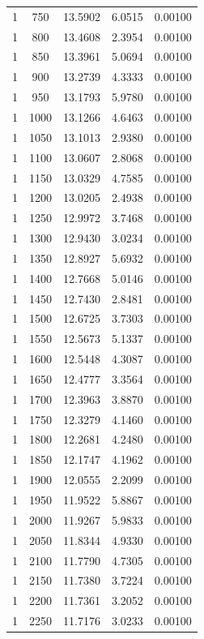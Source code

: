 \begin{longtable}{ccccc}
    1 & 750 & 13.5902 & 6.0515 & 0.00100 \\
    1 & 800 & 13.4608 & 2.3954 & 0.00100 \\
    1 & 850 & 13.3961 & 5.0694 & 0.00100 \\
    1 & 900 & 13.2739 & 4.3333 & 0.00100 \\
    1 & 950 & 13.1793 & 5.9780 & 0.00100 \\
    1 & 1000 & 13.1266 & 4.6463 & 0.00100 \\
    1 & 1050 & 13.1013 & 2.9380 & 0.00100 \\
    1 & 1100 & 13.0607 & 2.8068 & 0.00100 \\
    1 & 1150 & 13.0329 & 4.7585 & 0.00100 \\
    1 & 1200 & 13.0205 & 2.4938 & 0.00100 \\
    1 & 1250 & 12.9972 & 3.7468 & 0.00100 \\
    1 & 1300 & 12.9430 & 3.0234 & 0.00100 \\
    1 & 1350 & 12.8927 & 5.6932 & 0.00100 \\
    1 & 1400 & 12.7668 & 5.0146 & 0.00100 \\
    1 & 1450 & 12.7430 & 2.8481 & 0.00100 \\
    1 & 1500 & 12.6725 & 3.7303 & 0.00100 \\
    1 & 1550 & 12.5673 & 5.1337 & 0.00100 \\
    1 & 1600 & 12.5448 & 4.3087 & 0.00100 \\
    1 & 1650 & 12.4777 & 3.3564 & 0.00100 \\
    1 & 1700 & 12.3963 & 3.8870 & 0.00100 \\
    1 & 1750 & 12.3279 & 4.1460 & 0.00100 \\
    1 & 1800 & 12.2681 & 4.2480 & 0.00100 \\
    1 & 1850 & 12.1747 & 4.1962 & 0.00100 \\
    1 & 1900 & 12.0555 & 2.2099 & 0.00100 \\
    1 & 1950 & 11.9522 & 5.8867 & 0.00100 \\
    1 & 2000 & 11.9267 & 5.9833 & 0.00100 \\
    1 & 2050 & 11.8344 & 4.9330 & 0.00100 \\
    1 & 2100 & 11.7790 & 4.7305 & 0.00100 \\
    1 & 2150 & 11.7380 & 3.7224 & 0.00100 \\
    1 & 2200 & 11.7361 & 3.2052 & 0.00100 \\
    1 & 2250 & 11.7176 & 3.0233 & 0.00100 \\

\end{longtable}
